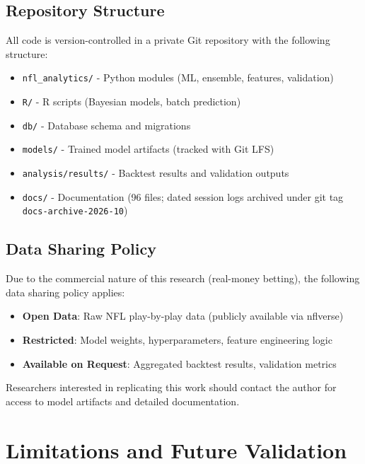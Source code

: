 \subsection{Repository Structure}

All code is version-controlled in a private Git repository with the following structure:

\begin{itemize}
    \item \texttt{nfl\_analytics/} - Python modules (ML, ensemble, features, validation)
    \item \texttt{R/} - R scripts (Bayesian models, batch prediction)
    \item \texttt{db/} - Database schema and migrations
    \item \texttt{models/} - Trained model artifacts (tracked with Git LFS)
    \item \texttt{analysis/results/} - Backtest results and validation outputs
    \item \texttt{docs/} - Documentation (96 files; dated session logs archived under git tag \texttt{docs-archive-2026-10})
\end{itemize}

\subsection{Data Sharing Policy}

Due to the commercial nature of this research (real-money betting), the following data sharing policy applies:

\begin{itemize}
    \item \textbf{Open Data}: Raw NFL play-by-play data (publicly available via nflverse)
    \item \textbf{Restricted}: Model weights, hyperparameters, feature engineering logic
    \item \textbf{Available on Request}: Aggregated backtest results, validation metrics
\end{itemize}

Researchers interested in replicating this work should contact the author for access to model artifacts and detailed documentation.

\section{Limitations and Future Validation}
\label{sec:future-validation}

